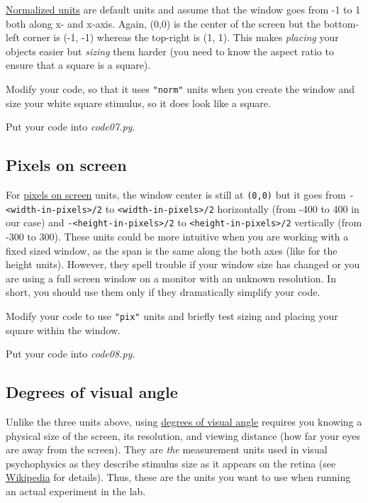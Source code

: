 \documentclass[
]{book}
\begin{document}
\href{https://psychopy.org/general/units.html\#normalised-units}{Normalized units} are default units and assume that the window goes from -1 to 1 both along x- and x-axis. Again, (0,0) is the center of the screen but the bottom-left corner is (-1, -1) whereas the top-right is (1, 1). This makes \emph{placing} your objects easier but \emph{sizing} them harder (you need to know the aspect ratio to ensure that a square is a square).

Modify your code, so that it uses \texttt{"norm"} units when you create the window and size your white square stimulus, so it does look like a square.

Put your code into \emph{code07.py}.

\hypertarget{pixels-on-screen}{%
\subsection{Pixels on screen}\label{pixels-on-screen}}

For \href{https://psychopy.org/general/units.html\#pixels-on-screen}{pixels on screen} units, the window center is still at \texttt{(0,0)} but it goes from \texttt{-\textless{}width-in-pixels\textgreater{}/2} to \texttt{\textless{}width-in-pixels\textgreater{}/2} horizontally (from -400 to 400 in our case) and \texttt{-\textless{}height-in-pixels\textgreater{}/2} to \texttt{\textless{}height-in-pixels\textgreater{}/2} vertically (from -300 to 300). These units could be more intuitive when you are working with a fixed sized window, as the span is the same along the both axes (like for the height units). However, they spell trouble if your window size has changed or you are using a full screen window on a monitor with an unknown resolution. In short, you should use them only if they dramatically simplify your code.

Modify your code to use \texttt{"pix"} units and briefly test sizing and placing your square within the window.

Put your code into \emph{code08.py}.

\hypertarget{degrees-of-visual-angle}{%
\subsection{Degrees of visual angle}\label{degrees-of-visual-angle}}

Unlike the three units above, using \href{https://psychopy.org/general/units.html\#degrees-of-visual-angle}{degrees of visual angle} requires you knowing a physical size of the screen, its resolution, and viewing distance (how far your eyes are away from the screen). They are \emph{the} measurement units used in visual psychophysics as they describe stimulus size as it appears on the retina (see \href{https://en.wikipedia.org/wiki/Visual_angle}{Wikipedia} for details). Thus, these are the units you want to use when running an actual experiment in the lab.
\end{document}

